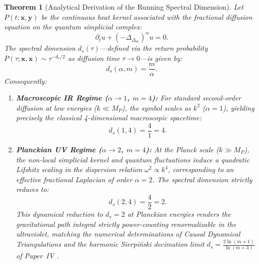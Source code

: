 \documentclass[11pt,a4paper,reqno]{amsart}
\newtheorem{theorem}{Theorem}[section]
\theoremstyle{definition}
\numberwithin{equation}{section}
\begin{document}
\begin{theorem}[Analytical Derivation of the Running Spectral Dimension]
\label{thm:running_spectral_dimension}
Let $P(t; \mathbf{x}, \mathbf{y})$ be the continuous heat kernel associated with the fractional diffusion equation on the quantum simplicial complex:
\begin{equation}
    \partial_t u + (-\Delta_{\Delta_m})^\alpha u = 0.
\end{equation}
The spectral dimension $d_s(\tau)$—defined via the return probability $P(\tau; \mathbf{x}, \mathbf{x}) \sim \tau^{-d_s/2}$ as diffusion time $\tau \to 0$—is given by:
\begin{equation}
    \label{eq:spectral_dimension_formula}
    d_s(\alpha, m) = \frac{m}{\alpha}.
\end{equation}
Consequently:
\begin{enumerate}[label=(\roman*)]
    \item \textbf{Macroscopic IR Regime ($\alpha \to 1$, $m = 4$):} For standard second-order diffusion at low energies ($k \ll M_P$), the symbol scales as $k^2$ ($\alpha = 1$), yielding precisely the classical 4-dimensional macroscopic spacetime:
    \begin{equation}
        d_s(1, 4) = \frac{4}{1} = 4.
    \end{equation}
    \item \textbf{Planckian UV Regime ($\alpha \to 2$, $m = 4$):} At the Planck scale ($k \gg M_P$), the non-local simplicial kernel and quantum fluctuations induce a quadratic Lifshitz scaling in the dispersion relation $\omega^2 \propto k^4$, corresponding to an effective fractional Laplacian of order $\alpha = 2$. The spectral dimension strictly reduces to:
    \begin{equation}
        d_s(2, 4) = \frac{4}{2} = 2.
    \end{equation}
    This dynamical reduction to $d_s = 2$ at Planckian energies renders the gravitational path integral strictly power-counting renormalizable in the ultraviolet, matching the numerical determinations of Causal Dynamical Triangulations \cite{ambjorn2005spectral} and the harmonic Sierpi\'nski decimation limit $d_s = \frac{2\ln(m+1)}{\ln(m+3)}$ of Paper~IV \cite{monarch2026pascal}.
\end{enumerate}
\end{theorem}
\end{document}
